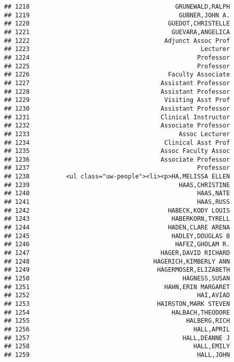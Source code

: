 \documentclass[
]{article}
\begin{document}
\begin{verbatim}
## 1218                                        GRUNEWALD,RALPH
## 1219                                         GUBNER,JOHN A.
## 1220                                      GUEDOT,CHRISTELLE
## 1221                                       GUEVARA,ANGELICA
## 1222                                     Adjunct Assoc Prof
## 1223                                               Lecturer
## 1224                                              Professor
## 1225                                              Professor
## 1226                                      Faculty Associate
## 1227                                    Assistant Professor
## 1228                                    Assistant Professor
## 1229                                     Visiting Asst Prof
## 1230                                    Assistant Professor
## 1231                                    Clinical Instructor
## 1232                                    Associate Professor
## 1233                                         Assoc Lecturer
## 1234                                     Clinical Asst Prof
## 1235                                    Assoc Faculty Assoc
## 1236                                    Associate Professor
## 1237                                              Professor
## 1238          <ul class="uw-people"><li><p>HA,MELISSA ELLEN
## 1239                                         HAAS,CHRISTINE
## 1240                                              HAAS,NATE
## 1241                                              HAAS,RUSS
## 1242                                      HABECK,KODY LOUIS
## 1243                                       HABERKORN,TYRELL
## 1244                                      HADEN,CLARE ARENA
## 1245                                       HADLEY,DOUGLAS B
## 1246                                        HAFEZ,GHOLAM R.
## 1247                                    HAGER,DAVID RICHARD
## 1248                                  HAGERICH,KIMBERLY ANN
## 1249                                   HAGERMOSER,ELIZABETH
## 1250                                          HAGNESS,SUSAN
## 1251                                     HAHN,ERIN MARGARET
## 1252                                              HAI,AVIAD
## 1253                                   HAIRSTON,MARK STEVEN
## 1254                                       HALBACH,THEODORE
## 1255                                           HALBERG,RICH
## 1256                                             HALL,APRIL
## 1257                                          HALL,DEANNE J
## 1258                                             HALL,EMILY
## 1259                                              HALL,JOHN

\end{verbatim}
\end{document}
